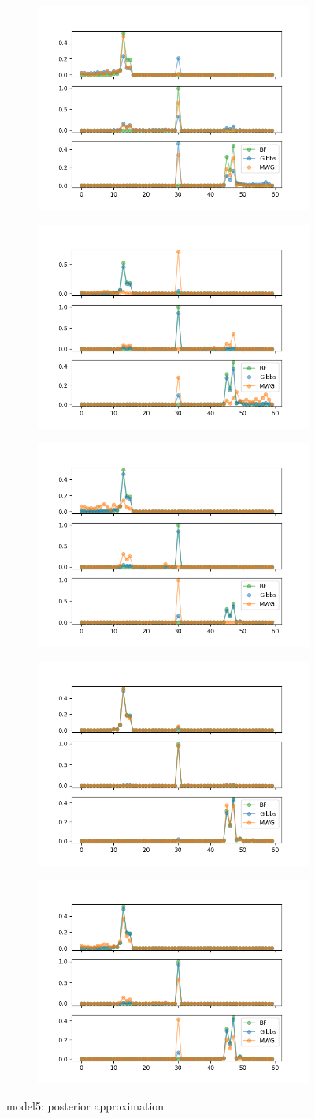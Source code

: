 \begin{figure}[h]
    \centering
    \begin{subfigure}
    	\centering
        \includegraphics[width=0.3\linewidth]{../../plots/Posterior_M4_N60_NMCMC3_seed0_diffind2.png}
    \end{subfigure}
    \begin{subfigure}
        \centering
    	\includegraphics[width=0.3\linewidth]{../../plots/Posterior_M4_N60_NMCMC3_seed1_diffind2.png}
	\end{subfigure}
	\begin{subfigure}
	    \centering
    	\includegraphics[width=0.3\linewidth]{../../plots/Posterior_M4_N60_NMCMC3_seed2_diffind2.png}
	\end{subfigure}
	\begin{subfigure}
	    \centering
    	\includegraphics[width=0.3\linewidth]{../../plots/Posterior_M4_N60_NMCMC3_seed3_diffind2.png}
	\end{subfigure}
	\begin{subfigure}
	    \centering
    	\includegraphics[width=0.3\linewidth]{../../plots/Posterior_M4_N60_NMCMC3_seed4_diffind2.png}
	\end{subfigure}
	\caption{model5: posterior approximation}
\end{figure}

